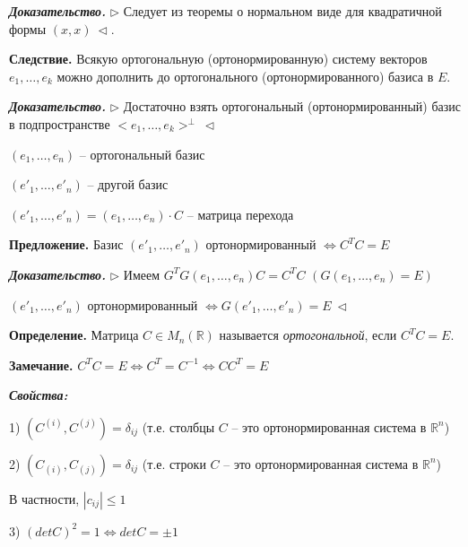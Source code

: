 \vspace{\baselineskip}
\textbf{\textit{Доказательство.}} $\rhd$ Следует из теоремы о нормальном виде для квадратичной формы $(x, x) \ \lhd$.

\vspace{\baselineskip}
\textbf{Следствие.} Всякую ортогональную (ортонормированную) систему векторов $e_1, \dots, e_k$  можно дополнить до ортогонального (ортонормированного) базиса в $E$.

\vspace{\baselineskip}
\textbf{\textit{Доказательство.}} $\rhd$ Достаточно взять ортогональный (ортонормированный) базис в подпространстве $<e_1, \dots, e_k>^{\bot} \ \lhd$

\vspace{\baselineskip}
$(e_1, \dots, e_n)$ -- ортогональный базис

$(e'_1, \dots, e'_n)$ -- другой базис

$(e'_1, \dots, e'_n) = (e_1, \dots, e_n) \cdot C$ -- матрица перехода

\vspace{\baselineskip}
\textbf{Предложение.} Базис $(e'_1, \dots, e'_n)$ ортонормированный $\Leftrightarrow C^T C = E$

\vspace{\baselineskip}
\textbf{\textit{Доказательство.}} $\rhd$ Имеем $G^T G(e_1, \dots, e_n) C = C^T C$ $(G(e_1, \dots, e_n) = E)$

$(e'_1, \dots, e'_n)$ ортонормированный $\Leftrightarrow G(e'_1, \dots, e'_n) = E \ \lhd$

\vspace{\baselineskip}
\textbf{Определение.} Матрица $C \in M_n (\mathbb{R})$ называется \textit{ортогональной}, если $C^T C = E$.

\vspace{\baselineskip}
\textbf{Замечание.} $C^T C = E \Leftrightarrow C^T = C^{-1} \Leftrightarrow C C^T = E$

\vspace{\baselineskip}
\textbf{\textit{Свойства:}}

1) $(C^{(i)}, C^{(j)}) = \delta_{ij}$ (т.е. столбцы $C$ -- это ортонормированная система в $\mathbb{R}^n$)

2) $(C_{(i)}, C_{(j)}) = \delta_{ij}$ (т.е. строки $C$ -- это ортонормированная система в $\mathbb{R}^n$)

В частности, $|c_{ij}| \leq 1$

3) $(det C)^2 = 1 \Leftrightarrow detC = \pm 1$

